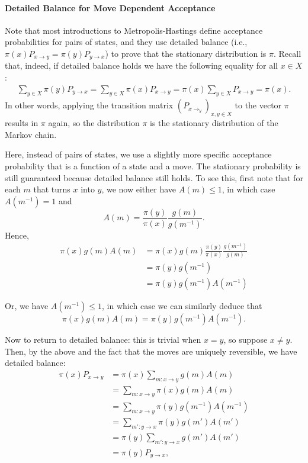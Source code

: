 \documentclass{article}
\theoremstyle{definition}
\begin{document}
\paragraph{Detailed Balance for Move Dependent Acceptance}
Note that most introductions to Metro\-polis-Hastings define acceptance probabilities for pairs of states, and they use detailed balance (i.e., $\pi(x) P_{x\to y} = \pi(y) P_{y\to x}$) to prove that the stationary distribution is $\pi$. Recall that, indeed, if detailed balance holds we have the following equality for all $x\in X$:
\begin{align*}
    \sum_{y\in X}\pi(y)P_{y\to x} = \sum_{y\in X} \pi(x) P_{x\to y} = \pi(x)\sum_{y\in X} P_{x\to y} = \pi(x).
\end{align*}
In other words, applying the transition matrix $(P_{x\to_y})_{x,y\in X}$ to the vector $\pi$ results in $\pi$ again, so the distribution $\pi$ is the stationary distribution of the Markov chain.

Here, instead of pairs of states, we use a slightly more specific acceptance probability that is a function of a state and a move. The stationary probability is still guaranteed because detailed balance still holds. To see this, first note that for each $m$ that turns $x$ into $y$, we now either have $A(m)\leq 1$, in which case $A(m^{-1})=1$ and 
\[A(m) = \frac{\pi(y)}{\pi(x)} \frac{g(m)}{g(m^{-1})}.\]
Hence, 
\begin{align*}
 \pi(x)g(m)A(m) & = \pi(x)g(m) \frac{\pi(y)}{\pi(x)} \frac{g(m^{-1})}{g(m)} \\
                            & = \pi(y) g(m^{-1}) \\
                            & = \pi(y) g(m^{-1}) A(m^{-1})
\end{align*}

Or, we have $A(m^{-1})\leq 1$, in which case we can similarly deduce that
\[
\pi(x)g(m)A(m)= \pi(y) g(m^{-1}) A(m^{-1}).
\]

Now to return to detailed balance: this is trivial when $x=y$, so suppose $x\neq y$. Then, by the above and the fact that the moves are uniquely reversible, we have detailed balance:
\begin{align*}
 \pi(x) P_{x\to y} & = \pi(x)\sum_{m:x\to y}g(m)A(m) \\
                & = \sum_{m:x\to y}\pi(x) g(m)A(m) \\
                & = \sum_{m:x\to y}\pi(y) g(m^{-1})A(m^{-1}) \\
                & = \sum_{m':y\to x}\pi(y) g(m')A(m') \\
                & = \pi(y) \sum_{m':y\to x} g(m')A(m') \\
                & = \pi(y)P_{y\to x},
\end{align*}
\end{document}
